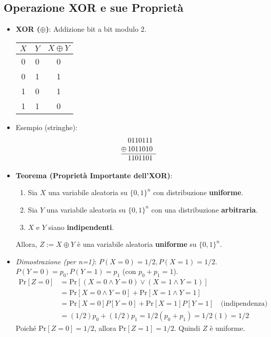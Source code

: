 \subsection{Operazione XOR e sue Proprietà}
\begin{itemize}
    \item \textbf{XOR ($\oplus$)}: Addizione bit a bit modulo 2.
    \begin{center}
    \begin{tabular}{cc|c}
        $X$ & $Y$ & $X \oplus Y$ \\ \hline
        0 & 0 & 0 \\
        0 & 1 & 1 \\
        1 & 0 & 1 \\
        1 & 1 & 0
    \end{tabular}
    \end{center}
    \item Esempio (stringhe):
    \[
    \begin{array}{@{}c@{\,}c@{}c@{}c@{}c@{}c@{}c@{}c}
      & 0 & 1 & 1 & 0 & 1 & 1 & 1 \\
    \oplus & 1 & 0 & 1 & 1 & 0 & 1 & 0 \\ \hline
      & 1 & 1 & 0 & 1 & 1 & 0 & 1
    \end{array}
    \]
    \item \textbf{Teorema (Proprietà Importante dell'XOR)}:
    \begin{enumerate}
        \item Sia $X$ una variabile aleatoria su $\{0,1\}^n$ con distribuzione \textbf{uniforme}.
        \item Sia $Y$ una variabile aleatoria su $\{0,1\}^n$ con una distribuzione \textbf{arbitraria}.
        \item $X$ e $Y$ siano \textbf{indipendenti}.
    \end{enumerate}
    Allora, $Z := X \oplus Y$ è una variabile aleatoria \textbf{uniforme} su $\{0,1\}^n$.
    \item \textit{Dimostrazione (per n=1)}:
        $P(X=0)=1/2, P(X=1)=1/2$. $P(Y=0)=p_0, P(Y=1)=p_1$ (con $p_0+p_1=1$).
        \begin{align*} \text{Pr}[Z=0] &= \text{Pr}[(X=0 \land Y=0) \lor (X=1 \land Y=1)] \\ &= \text{Pr}[X=0 \land Y=0] + \text{Pr}[X=1 \land Y=1] \\ &= \text{Pr}[X=0]P[Y=0] + \text{Pr}[X=1]P[Y=1] \quad \text{(indipendenza)} \\ &= (1/2)p_0 + (1/2)p_1 = 1/2(p_0+p_1) = 1/2(1) = 1/2 \end{align*}
        Poiché $\text{Pr}[Z=0]=1/2$, allora $\text{Pr}[Z=1]=1/2$. Quindi $Z$ è uniforme.
\end{itemize}

